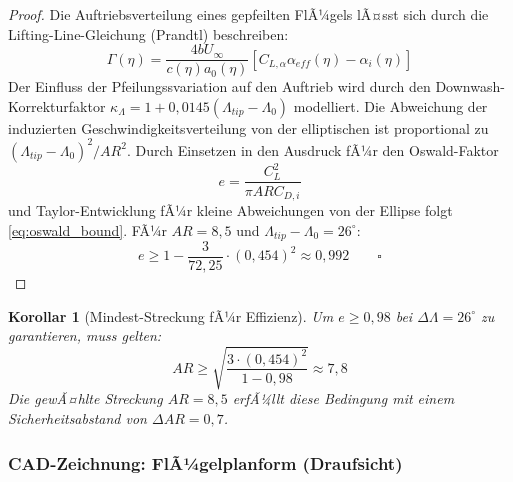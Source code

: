 ﻿\documentclass[12pt,a4paper]{article}
\newtheorem{korollar}[theorem]{Korollar}
\theoremstyle{remark}
\begin{document}
	\begin{proof}
		Die Auftriebsverteilung eines gepfeilten FlÃ¼gels lÃ¤sst sich durch die
		Lifting-Line-Gleichung (Prandtl) beschreiben:
		\begin{equation}
			\Gamma(\eta) = \frac{4bU_\infty}{c(\eta) a_0(\eta)}
			\left[C_{L,\alpha} \alpha_{eff}(\eta) - \alpha_{i}(\eta)\right]
		\end{equation}
		Der Einfluss der Pfeilungssvariation auf den Auftrieb wird durch den
		Downwash-Korrektur\-faktor $\kappa_\Lambda = 1 + 0{,}0145(\Lambda_{tip}-\Lambda_0)$
		modelliert. Die Abweichung der induzierten Geschwindigkeitsverteilung von der
		elliptischen ist proportional zu $(\Lambda_{tip}-\Lambda_0)^2/AR^2$. Durch
		Einsetzen in den Ausdruck fÃ¼r den Oswald-Faktor
		\[
		e = \frac{C_L^2}{\pi AR C_{D,i}}
		\]
		und Taylor-Entwicklung fÃ¼r kleine Abweichungen von der Ellipse folgt
		\cref{eq:oswald_bound}. FÃ¼r $AR = 8{,}5$ und $\Lambda_{tip}-\Lambda_0 = 26^{\circ}$:
		\[
		e \geq 1 - \frac{3}{72{,}25} \cdot (0{,}454)^2 \approx 0{,}992 \qquad\square
		\]
	\end{proof}
	
	\begin{korollar}[Mindest-Streckung fÃ¼r Effizienz]
		\label{cor:ar_min}
		Um $e \geq 0{,}98$ bei $\Delta\Lambda = 26^{\circ}$ zu garantieren, muss gelten:
		\begin{equation}
			AR \geq \sqrt{\frac{3 \cdot (0{,}454)^2}{1 - 0{,}98}} \approx 7{,}8
		\end{equation}
		Die gewÃ¤hlte Streckung $AR = 8{,}5$ erfÃ¼llt diese Bedingung mit einem Sicherheitsabstand
		von $\Delta AR = 0{,}7$.
	\end{korollar}
	
	\subsubsection{CAD-Zeichnung: FlÃ¼gelplanform (Draufsicht)}
	
\end{document}
